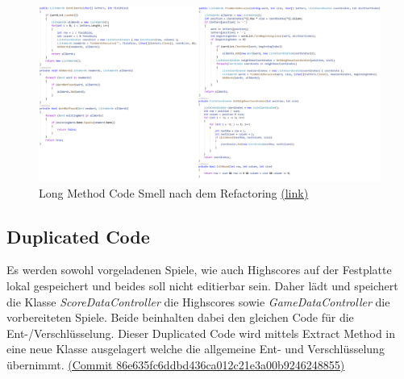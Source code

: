 \begin{figure}[!ht]
  \centering
  \includegraphics[width=\textwidth]{Bilder/endeRefactoring1.PNG}
  \caption[Long Method Code Smell nach dem Refactoring]{Long Method Code Smell nach dem Refactoring \href{https://github.com/EinToni/WortfinderDoku/blob/main/Bilder/endeRefactoring1.png}{(link)}}
  \label{Abb:endeRefactoring1}
\end{figure}
\newpage
\subsection{Duplicated Code}

Es werden sowohl vorgeladenen Spiele, wie auch Highscores auf der Festplatte lokal gespeichert und beides soll nicht editierbar sein. Daher lädt und speichert die Klasse \textit{ScoreDataController} die Highscores sowie \textit{GameDataController} die vorbereiteten Spiele. Beide beinhalten dabei den gleichen Code für die Ent-/Verschlüsselung. Dieser Duplicated Code wird mittels Extract Method in eine neue Klasse ausgelagert welche die allgemeine Ent- und Verschlüsselung übernimmt. \href{https://github.com/EinToni/Wortfinder/commit/86e635fc6ddbd436ca012c21e3a00b9246248855}{(Commit 86e635fc6ddbd436ca012c21e3a00b9246248855)}

\endinput